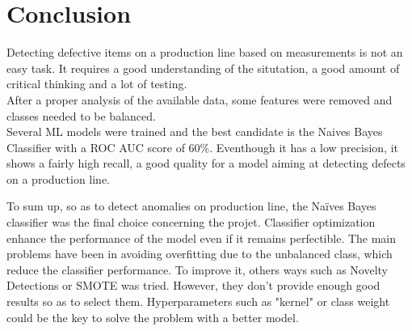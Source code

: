 \section{Conclusion}
Detecting defective items on a production line based on measurements is not an easy task. It requires a good understanding of the situtation, a good amount of critical thinking and a lot of testing.\\

After a proper analysis of the available data, some features were removed and classes needed to be balanced.\\

Several ML models were trained and the best candidate is the Naives Bayes Classifier with a ROC AUC score of 60\%. Eventhough it has a low precision, it shows a fairly high recall, a good quality for a model aiming at detecting defects on a production line.

To sum up, so as to detect anomalies on production line, the Naïves Bayes classifier was the final choice concerning the projet. Classifier optimization enhance the performance of the model even if it remains perfectible. The main problems have been in avoiding overfitting due to the unbalanced class, which reduce the classifier performance.
To improve it, others ways such as Novelty Detections or SMOTE was tried. However, they don't provide enough good results so as to select them. Hyperparameters such as "kernel" or class weight could be the key to solve the problem with a better model.